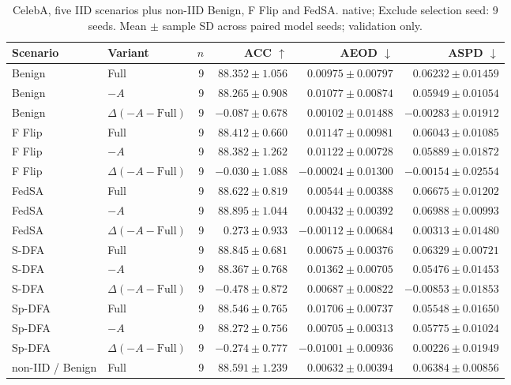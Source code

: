 \begin{table}[t]
\centering
\small
\caption{CelebA, five IID scenarios plus non-IID Benign, F Flip and FedSA. native; Exclude selection seed: 9 seeds. Mean $\pm$ sample SD across paired model seeds; validation only.}
\begin{tabular}{llrrrr}
\toprule
Scenario & Variant & $n$ & ACC $\uparrow$ & AEOD $\downarrow$ & ASPD $\downarrow$ \\
\midrule
Benign & Full & 9 & $88.352 \pm 1.056$ & $0.00975 \pm 0.00797$ & $0.06232 \pm 0.01459$ \\
Benign & $-A$ & 9 & $88.265 \pm 0.908$ & $0.01077 \pm 0.00874$ & $0.05949 \pm 0.01054$ \\
Benign & $\Delta(-A-\mathrm{Full})$ & 9 & $-0.087 \pm 0.678$ & $0.00102 \pm 0.01488$ & $-0.00283 \pm 0.01912$ \\
F Flip & Full & 9 & $88.412 \pm 0.660$ & $0.01147 \pm 0.00981$ & $0.06043 \pm 0.01085$ \\
F Flip & $-A$ & 9 & $88.382 \pm 1.262$ & $0.01122 \pm 0.00728$ & $0.05889 \pm 0.01872$ \\
F Flip & $\Delta(-A-\mathrm{Full})$ & 9 & $-0.030 \pm 1.088$ & $-0.00024 \pm 0.01300$ & $-0.00154 \pm 0.02554$ \\
FedSA & Full & 9 & $88.622 \pm 0.819$ & $0.00544 \pm 0.00388$ & $0.06675 \pm 0.01202$ \\
FedSA & $-A$ & 9 & $88.895 \pm 1.044$ & $0.00432 \pm 0.00392$ & $0.06988 \pm 0.00993$ \\
FedSA & $\Delta(-A-\mathrm{Full})$ & 9 & $0.273 \pm 0.933$ & $-0.00112 \pm 0.00684$ & $0.00313 \pm 0.01480$ \\
S-DFA & Full & 9 & $88.845 \pm 0.681$ & $0.00675 \pm 0.00376$ & $0.06329 \pm 0.00721$ \\
S-DFA & $-A$ & 9 & $88.367 \pm 0.768$ & $0.01362 \pm 0.00705$ & $0.05476 \pm 0.01453$ \\
S-DFA & $\Delta(-A-\mathrm{Full})$ & 9 & $-0.478 \pm 0.872$ & $0.00687 \pm 0.00822$ & $-0.00853 \pm 0.01853$ \\
Sp-DFA & Full & 9 & $88.546 \pm 0.765$ & $0.01706 \pm 0.00737$ & $0.05548 \pm 0.01650$ \\
Sp-DFA & $-A$ & 9 & $88.272 \pm 0.756$ & $0.00705 \pm 0.00313$ & $0.05775 \pm 0.01024$ \\
Sp-DFA & $\Delta(-A-\mathrm{Full})$ & 9 & $-0.274 \pm 0.777$ & $-0.01001 \pm 0.00936$ & $0.00226 \pm 0.01949$ \\
non-IID / Benign & Full & 9 & $88.591 \pm 1.239$ & $0.00632 \pm 0.00394$ & $0.06384 \pm 0.00856$ \\

\end{tabular}
\end{table}
